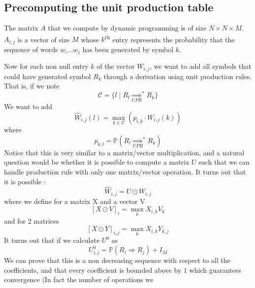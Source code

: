 \documentclass[a4paper, 11pt]{article}
\begin{document}
\subsection{Precomputing the unit production table}

The matrix $A$ that we compute by dynamic programming is of size
$N \times N \times M$. $A_{i,j}$ is a vector of size $M$ whose
$k$\textsuperscript{th} entry represents the probability that the
sequence of words $w_i \dots w_j$ has been generated by symbol $k$.

Now for each non null entry $k$ of the vector $W_{i,j}$, we want to
add all symbols that could have generated symbol $R_k$ through a
derivation using unit production rules. That is, if we note
\begin{displaymath}
  \mathcal{C} = \{
  l \mid
  R_l \underset{UPR}{\Longrightarrow}^* R_k %
  \}
\end{displaymath}
We want to add
\begin{displaymath}
  \hat{W}_{i, j}(l) = \max_{k \in \mathcal{C}}{\left(p_{l,k} \cdot W_{i, j}(k)\right)}
\end{displaymath}
where
\begin{displaymath}
  p_{k,l} = \mathbb{P}(R_l \underset{UPR}{\Longrightarrow}^* R_k)
\end{displaymath}
Notice that this is very similar to a matrix/vector multiplication,
and a natural question would be whether it is possible to compute a
matrix $U$ such that we can handle production rule with only one
matrix/vector operation. It turns out that it is possible :
\begin{displaymath}
  \hat{W}_{i, j} = U \odot W_{i, j}
\end{displaymath}
where we define for a matrix X and a vector V
\begin{displaymath}
  \left[ X \odot V \right]_i = \max_k X_{i,k} V_{k}
\end{displaymath}
and for 2 matrices
\begin{displaymath}
  \left[ X \odot Y \right]_{i,j} = \max_k X_{i,k} Y_{k, j}
\end{displaymath}
It turns out that if we calculate $U^0$ as
\begin{displaymath}
  U^0_{i,j} = \mathbb{P} ( R_i \Rightarrow R_j ) + I_M
\end{displaymath}
We can prove that this is a non decreasing sequence with respect to
all the coefficients, and that every coefficient is bounded above by
$1$ which guarantees convergence (In fact the number of operations we
\end{document}
